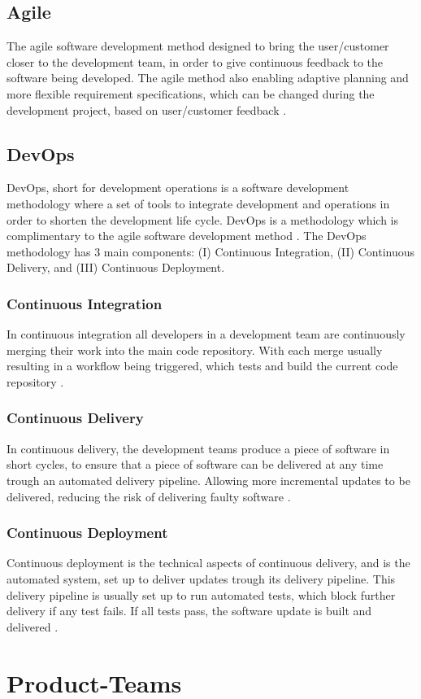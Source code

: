 \subsection{Agile}
The agile software development method designed to bring the user/customer closer to the development team, in order to give continuous feedback to the software being developed. The agile method also enabling adaptive planning and more flexible requirement specifications, which can be changed during the development project, based on user/customer feedback \cite{agile_software_development_wiki_2023}.

\subsection{DevOps}
DevOps, short for development operations is a software development methodology where a set of tools to integrate development and operations in order to shorten the development life cycle. DevOps is a methodology which is complimentary to the agile software development method \cite{devops_wiki_2023}. The DevOps methodology has 3 main components: (I) Continuous Integration, (II) Continuous Delivery, and (III) Continuous Deployment.

\subsubsection{Continuous Integration}
In continuous integration all developers in a development team are continuously merging their work into the main code repository. With each merge usually resulting in a workflow being triggered, which tests and build the current code repository \cite{continuous_integration_wiki_2023}.

\subsubsection{Continuous Delivery}
In continuous delivery, the development teams produce a piece of software in short cycles, to ensure that a piece of software can be delivered at any time trough an automated delivery pipeline. Allowing more incremental updates to be delivered, reducing the risk of delivering faulty software \cite{continuous_delivery_wiki_2023}.

\subsubsection{Continuous Deployment}
Continuous deployment is the technical aspects of continuous delivery, and is the automated system, set up to deliver updates trough its delivery pipeline. This delivery pipeline is usually set up to run automated tests, which block further delivery if any test fails. If all tests pass, the software update is built and delivered \cite{continuous_deployment_wiki_2023}.

\section{Product-Teams}